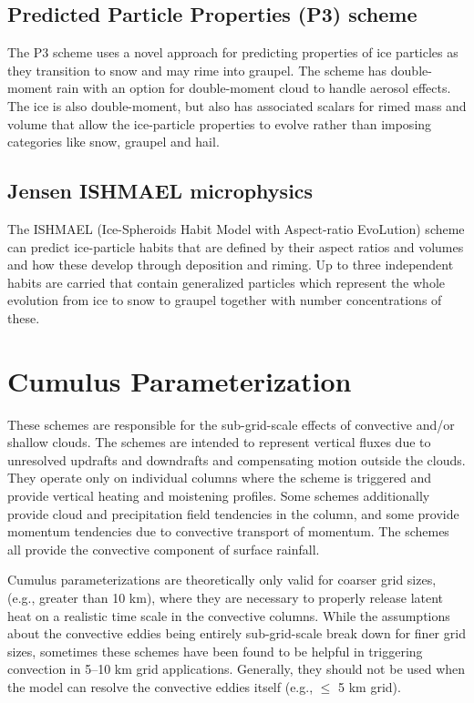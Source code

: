 \subsection {Predicted Particle Properties (P3) scheme}
The P3 scheme \citep{morrison15} uses a novel approach for predicting properties of ice particles as they transition to
snow and may rime into graupel. The scheme has double-moment rain with an option for double-moment cloud to
handle aerosol effects. The ice is also double-moment, but also has associated scalars for rimed mass and volume that
allow the ice-particle properties to evolve rather than imposing categories like snow, graupel and hail.

\subsection {Jensen ISHMAEL microphysics}
The ISHMAEL (Ice-Spheroids Habit Model with Aspect-ratio EvoLution) scheme \citep{jensen17} can predict ice-particle habits
that are defined by their aspect ratios and volumes and how these develop through deposition and riming. Up to three independent
habits are carried that contain generalized particles which represent the whole evolution from ice to snow to graupel together with
number concentrations of these.


\section{Cumulus Parameterization}

These schemes are responsible for the sub-grid-scale effects of 
convective and/or shallow clouds. The schemes are intended to 
represent vertical fluxes due to unresolved updrafts and 
downdrafts and compensating motion outside the clouds. They 
operate only on individual columns where the scheme is triggered and 
provide vertical heating and moistening profiles. Some schemes 
additionally provide cloud and precipitation field tendencies 
in the column, and some provide momentum tendencies 
due to convective transport of momentum. The schemes all provide 
the convective component of surface rainfall.

Cumulus parameterizations are theoretically only valid for coarser grid sizes,
(e.g., greater than 10 km), where they are necessary to properly
release latent heat on a realistic time scale in the convective columns.
While the assumptions about the convective eddies being entirely
sub-grid-scale break down for finer grid sizes, sometimes these
schemes have been found to be helpful in triggering convection in
5--10 km grid applications. Generally, they should not be used when
the model can resolve the convective eddies itself (e.g., $\le$ 5 km grid).

